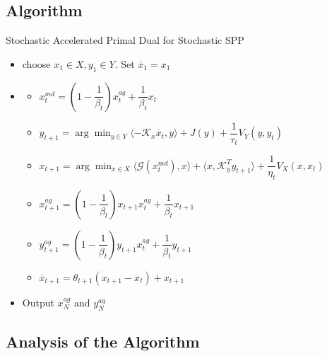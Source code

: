 \documentclass[12pt,reqno]{amsart}
\numberwithin{equation}{section}
\begin{document}
\subsection{Algorithm}

Stochastic Accelerated Primal Dual for Stochastic SPP
\begin{itemize}
\item choose $x_{1} \in X, y_{1} \in Y$. Set $\overline{x}_{1} = x_{1}$
\item

\begin{itemize}
\item $x_{t}^{md} = (1 - \dfrac{1}{\beta_{t}})x_{t}^{ag} +  \dfrac{1}{\beta_{t}}x_{t}$
\item $y_{t+1} = \arg\min_{y \in Y} \langle -\mathcal{K}_{x}\overline{x}_{t},y\rangle + J(y) + \dfrac{1}{\tau_{t}}V_{Y}(y,y_{t})$
\item $x_{t+1} = \arg\min_{x \in X} \langle \mathcal{G}(x_{t}^{md}) ,x \rangle + \langle x,\mathcal{K}_{y}^{T}y_{t+1} \rangle + \dfrac{1}{\eta_{t}}V_{X}(x,x_{t})$
\item $x_{t+1}^{ag} = (1 -  \dfrac{1}{\beta_{t}})x_{t+1}x_{t}^{ag}+ \dfrac{1}{\beta_{t}}x_{t+1}$
\item $y_{t+1}^{ag} = (1 -  \dfrac{1}{\beta_{t}})y_{t+1}x_{t}^{ag}+ \dfrac{1}{\beta_{t}}y_{t+1}$
\item $\overline{x}_{t+1} = \theta_{t+1}(x_{t+1} - x_{t}) + x_{t+1}$
\end{itemize}

\item Output $x_{N}^{ag}$ and $y_{N}^{ag}$
\end{itemize}


\subsection{Analysis of the Algorithm}
\end{document}
